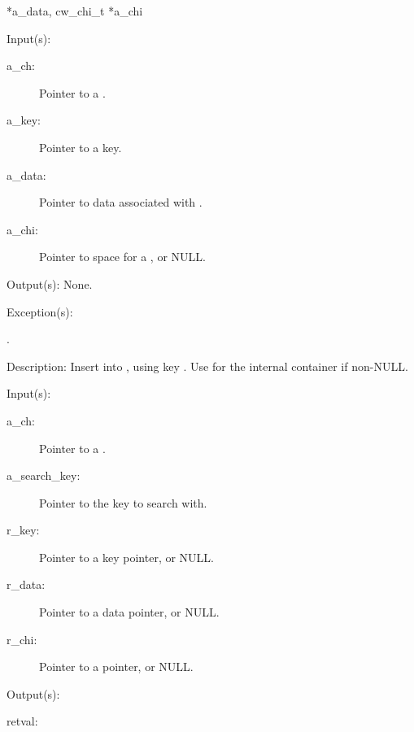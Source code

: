 \begin{capi}
{{*a\_data, cw\_chi\_t *a\_chi}}
	\begin{capilist}
	\item[Input(s): ]
		\begin{description}\item[]
		\item[a\_ch: ]
			Pointer to a .
		\item[a\_key: ]
			Pointer to a key.
		\item[a\_data: ]
			Pointer to data associated with .
		\item[a\_chi: ]
			Pointer to space for a , or NULL.
		\end{description}
	\item[Output(s): ] None.
	\item[Exception(s): ]
		\begin{description}\item[]
		\item[.]
		\end{description}
	\item[Description: ]
		Insert  into , using key
		.  Use  for the internal
		 container if non-NULL.
	\end{capilist}
\label{ch_remove}
	\begin{capilist}
	\item[Input(s): ]
		\begin{description}\item[]
		\item[a\_ch: ]
			Pointer to a \classname{ch}.
		\item[a\_search\_key: ]
			Pointer to the key to search with.
		\item[r\_key: ]
			Pointer to a key pointer, or NULL.
		\item[r\_data: ]
			Pointer to a data pointer, or NULL.
		\item[r\_chi: ]
			Pointer to a  pointer, or NULL.
		\end{description}
	\item[Output(s): ]
		\begin{description}\item[]
		\item[retval: ]
			\begin{description}\item[]

\end{description}
\end{description}
\end{capilist}
\end{capi}
